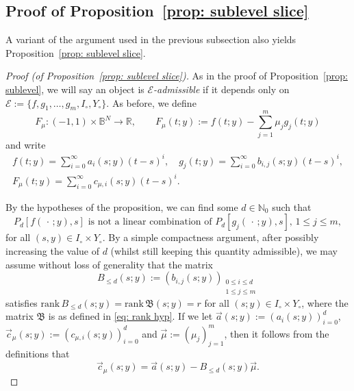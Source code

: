 \documentclass[reqno]{amsart}
\numberwithin{equation}{section}
\newcommand{\B}{\mathbb{B}}
\newcommand{\N}{\mathbb{N}}
\newcommand{\R}{\mathbb{R}}
\newcommand{\sE}{\mathscr{E}}
\newcommand{\fB}{\mathfrak{B}}
\theoremstyle{plain}
\theoremstyle{definition}
\newcommand{\rank}{\mathrm{rank}\,}
\begin{document}
\subsection{Proof of Proposition~\ref{prop: sublevel slice}}\label{subsec: lin ind proof 2} A variant of the argument used in the previous subsection also yields  Proposition~\ref{prop: sublevel slice}. 


\begin{proof}[Proof (of Proposition~\ref{prop: sublevel slice})] As in the proof of Proposition~\ref{prop: sublevel}, we will say an object is \textit{$\sE$-admissible} if it depends only on $\sE := \{f, g_1, \dots, g_m, I_{\circ}, Y_{\circ}\}$. As before, we define
\begin{equation*}
  F_{\mu} \colon (-1,1) \times \B^N \to \R, \qquad  F_{\mu}(t;y) := f(t;y) - \sum_{j=1}^m \mu_j g_j(t;y)
\end{equation*}
and write
\begin{gather*}
   f(t;y) = \sum_{i=0}^{\infty} a_i(s;y) (t-s)^i, \quad  g_j(t;y) = \sum_{i=0}^{\infty} b_{i, j}(s;y) (t-s)^i, \\   F_{\mu}(t;y) = \sum_{i = 0}^{\infty} c_{\mu,i}(s;y) (t-s)^i.
\end{gather*}

By the hypotheses of the proposition, we can find some $d \in \N_0$ such that 
\begin{equation}\label{eq: poly non linear comb}
    P_d[f(\,\cdot\,;y),s] \textrm{ is not a linear combination of } P_d[g_j(\,\cdot\,;y), s],\, 1 \leq j \leq m,
\end{equation}
for all $(s,y) \in I_{\circ}\times Y_{\circ}$. By a simple compactness argument, after possibly increasing the value of $d$ (whilst still keeping this quantity admissible), we may assume without loss of generality that the matrix 
\begin{equation*}
  B_{\le d}(s;y) :=  (b_{i,j}(s;y))_{\substack{ 0 \leq i \leq d \\ 1 \leq j \leq m}}
\end{equation*}
satisfies $\rank  B_{\leq d}(s;y) = \rank \fB(s;y) = r$ for all $(s;y) \in I_{\circ} \times Y_{\circ}$, where the matrix $\fB$ is as defined in \eqref{eq: rank hyp}. If we let $\vec{a}(s;y) := (a_i(s;y))_{i=0}^d$, $\vec{c}_{\mu}(s;y) := (c_{\mu, i}(s;y))_{i=0}^d$ and $\vec{\mu} := (\mu_j)_{j=1}^m$, then it follows from the definitions that
\begin{equation}\label{eq: relating Taylor coeff}
    \vec{c}_{\mu}(s;y) = \vec{a}(s;y) - B_{\le d}(s;y)\vec{\mu}. 
\end{equation}


\end{proof}
\end{document}
